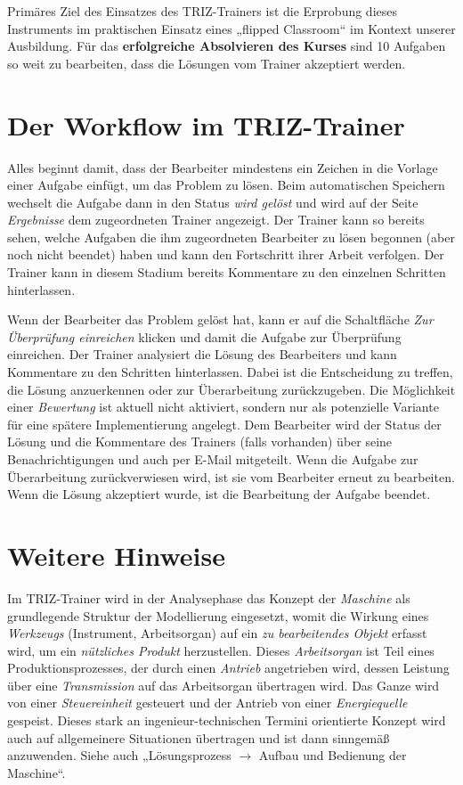 \documentclass[11pt,a4paper]{article}
\begin{document}
Primäres Ziel des Einsatzes des TRIZ-Trainers ist die Erprobung dieses
Instruments im praktischen Einsatz eines „flipped Classroom“ im Kontext
unserer Ausbildung.  Für das \textbf{erfolgreiche Absolvieren des Kurses} sind
10 Aufgaben so weit zu bearbeiten, dass die Lösungen vom Trainer akzeptiert
werden. 

\section{Der Workflow im TRIZ-Trainer}

Alles beginnt damit, dass der Bearbeiter mindestens ein Zeichen in die Vorlage
einer Aufgabe einfügt, um das Problem zu lösen. Beim automatischen Speichern
wechselt die Aufgabe dann in den Status \emph{wird gelöst} und wird auf der
Seite \emph{Ergebnisse} dem zugeordneten Trainer angezeigt. Der Trainer kann
so bereits sehen, welche Aufgaben die ihm zugeordneten Bearbeiter zu lösen
begonnen (aber noch nicht beendet) haben und kann den Fortschritt ihrer Arbeit
verfolgen. Der Trainer kann in diesem Stadium bereits Kommentare zu den
einzelnen Schritten hinterlassen.

Wenn der Bearbeiter das Problem gelöst hat, kann er auf die Schaltfläche
\emph{Zur Überprüfung einreichen} klicken und damit die Aufgabe zur
Überprüfung einreichen.  Der Trainer analysiert die Lösung des Bearbeiters und
kann Kommentare zu den Schritten hinterlassen. Dabei ist die Entscheidung zu
treffen, die Lösung anzuerkennen oder zur Überarbeitung zurückzugeben. Die
Möglichkeit einer \emph{Bewertung} ist aktuell nicht aktiviert, sondern nur
als potenzielle Variante für eine spätere Implementierung angelegt. Dem
Bearbeiter wird der Status der Lösung und die Kommentare des Trainers (falls
vorhanden) über seine Benachrichtigungen und auch per E-Mail mitgeteilt.  Wenn
die Aufgabe zur Überarbeitung zurückverwiesen wird, ist sie vom Bearbeiter
erneut zu bearbeiten. Wenn die Lösung akzeptiert wurde, ist die Bearbeitung
der Aufgabe beendet.

\section{Weitere Hinweise}

Im TRIZ-Trainer wird in der Analysephase das Konzept der \emph{Maschine} als
grundlegende Struktur der Modellierung eingesetzt, womit die Wirkung eines
\emph{Werkzeugs} (Instrument, Arbeitsorgan) auf ein \emph{zu bearbeitendes
  Objekt} erfasst wird, um ein \emph{nützliches Produkt} herzustellen.  Dieses
\emph{Arbeitsorgan} ist Teil eines Produktionsprozesses, der durch einen
\emph{Antrieb} angetrieben wird, dessen Leistung über eine \emph{Transmission}
auf das Arbeitsorgan übertragen wird.  Das Ganze wird von einer
\emph{Steuereinheit} gesteuert und der Antrieb von einer \emph{Energiequelle}
gespeist.  Dieses stark an ingenieur-technischen Termini orientierte Konzept
wird auch auf allgemeinere Situationen übertragen und ist dann sinngemäß
anzuwenden.  Siehe auch „Lösungsprozess $\to$ Aufbau und Bedienung der
Maschine“.
\end{document}
